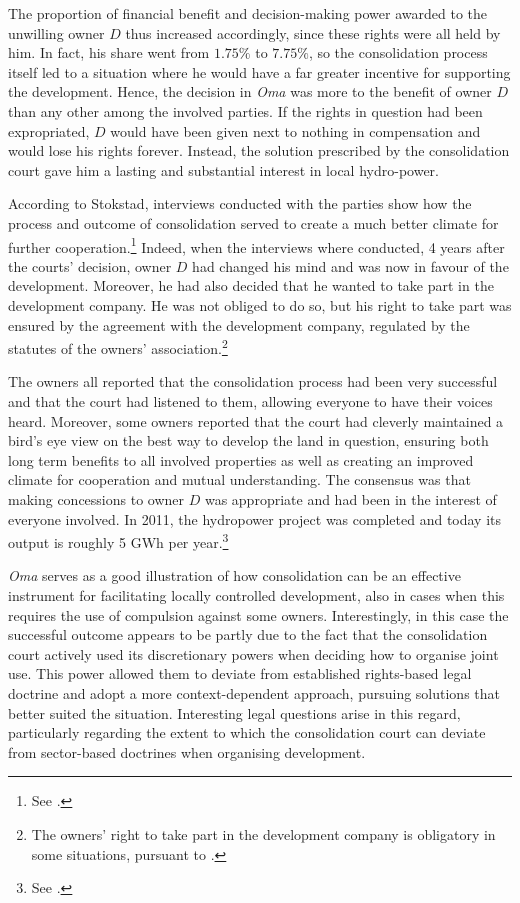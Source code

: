 The proportion of financial benefit and decision-making power awarded to the unwilling owner $D$ thus increased accordingly, since these rights were all held by him. In fact, his share went from $1.75 \%$ to $7.75 \%$, so the consolidation process itself led to a situation where he would have a far greater incentive for supporting the development. Hence, the decision in \emph{Oma} was more to the benefit of owner $D$ than any other among the involved parties. If the rights in question had been expropriated, $D$ would have been given next to nothing in compensation and would lose his rights forever. Instead, the solution prescribed by the consolidation court gave him a lasting and substantial interest in local hydro-power.

According to Stokstad, interviews conducted with the parties show how the process and outcome of consolidation served to create a much better climate for further cooperation.\footnote{See \cite[44-45]{stokstad11}.} Indeed, when the interviews where conducted, 4 years after the courts' decision, owner $D$ had changed his mind and was now in favour of the development. Moreover, he had also decided that he wanted to take part in the development company. He was not obliged to do so, but his right to take part was ensured by the agreement with the development company, regulated by the statutes of the owners' association.\footnote{The owners' right to take part in the development company is obligatory in some situations, pursuant to \dni\cite[34 b) no 3]{lca79}.}

The owners all reported that the consolidation process had been very successful and that the court had listened to them, allowing everyone to have their voices heard. Moreover, some owners reported that the court had cleverly maintained a bird's eye view on the best way to develop the land in question, ensuring both long term benefits to all involved properties as well as creating an improved climate for cooperation and mutual understanding. The consensus was that making concessions to owner $D$ was appropriate and had been in the interest of everyone involved. In 2011, the hydropower project was completed and today its output is roughly 5 GWh per year.\footnote{See \cite[45]{stokstad11}.}

\emph{Oma} serves as a good illustration of how consolidation can be an effective instrument for facilitating locally controlled development, also in cases when this requires the use of compulsion against some owners. Interestingly, in this case the successful outcome appears to be partly due to the fact that the consolidation court actively used its discretionary powers when deciding how to organise joint use. This power allowed them to deviate from established rights-based legal doctrine and adopt a more context-dependent approach, pursuing solutions that better suited the situation. Interesting legal questions arise in this regard, particularly regarding the extent to which the consolidation court can deviate from sector-based doctrines when organising development.


